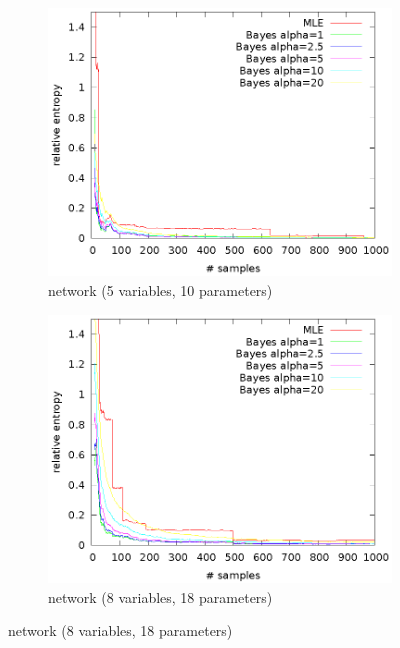 \documentclass[english,cover]{fitthesis} %
\begin{document}
\begin{center}
\begin{figure}[h]
    \begin{subfigure}[b]{0.55\linewidth}
        \hspace{-3.2cm}\includegraphics[scale=0.95]{fig/kl-cancer}
        \caption{ network (5 variables, 10 parameters)}
    \end{subfigure}
    \quad
    \begin{subfigure}[b]{0.55\linewidth}
        \hspace{-2.8cm}\includegraphics[scale=0.95]{fig/kl-asia}
        \caption{ network (8 variables, 18 parameters)}
    \end{subfigure}
  

\end{figure}
\end{center}
\end{document}
